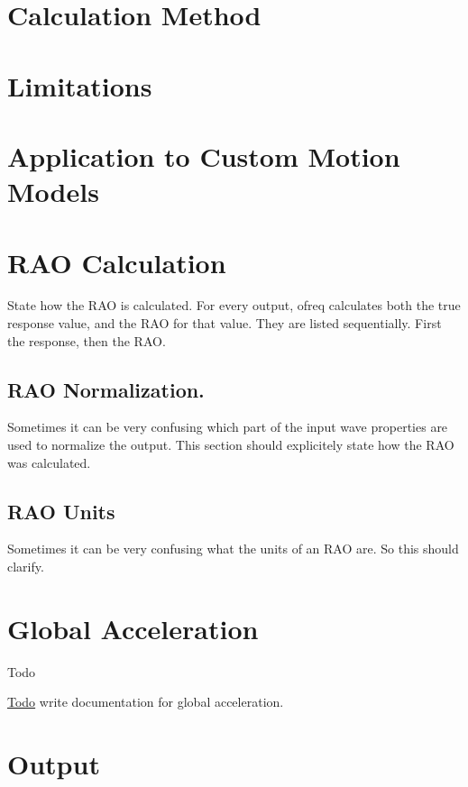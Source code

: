 \section*{Calculation Method}

\section*{Limitations}

\section*{Application to Custom Motion Models}

\section*{R\-A\-O Calculation}

State how the R\-A\-O is calculated. For every output, ofreq calculates both the true response value, and the R\-A\-O for that value. They are listed sequentially. First the response, then the R\-A\-O.

\subsection*{R\-A\-O Normalization.}

Sometimes it can be very confusing which part of the input wave properties are used to normalize the output. This section should explicitely state how the R\-A\-O was calculated.

\subsection*{R\-A\-O Units}

Sometimes it can be very confusing what the units of an R\-A\-O are. So this should clarify. \hypertarget{global_acceleration}{}\section{Global Acceleration}\label{global_acceleration}
\begin{DoxyRefDesc}{Todo}
\item[\hyperlink{todo__todo000018}{Todo}]write documentation for global acceleration.\end{DoxyRefDesc}


\section*{Output}

